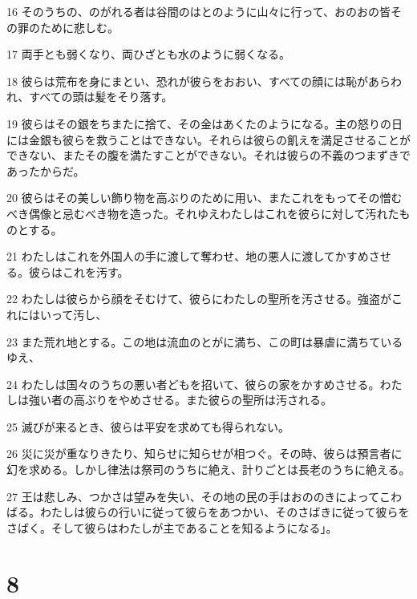 \par 16 そのうちの、のがれる者は谷間のはとのように山々に行って、おのおの皆その罪のために悲しむ。
\par 17 両手とも弱くなり、両ひざとも水のように弱くなる。
\par 18 彼らは荒布を身にまとい、恐れが彼らをおおい、すべての顔には恥があらわれ、すべての頭は髪をそり落す。
\par 19 彼らはその銀をちまたに捨て、その金はあくたのようになる。主の怒りの日には金銀も彼らを救うことはできない。それらは彼らの飢えを満足させることができない、またその腹を満たすことができない。それは彼らの不義のつまずきであったからだ。
\par 20 彼らはその美しい飾り物を高ぶりのために用い、またこれをもってその憎むべき偶像と忌むべき物を造った。それゆえわたしはこれを彼らに対して汚れたものとする。
\par 21 わたしはこれを外国人の手に渡して奪わせ、地の悪人に渡してかすめさせる。彼らはこれを汚す。
\par 22 わたしは彼らから顔をそむけて、彼らにわたしの聖所を汚させる。強盗がこれにはいって汚し、
\par 23 また荒れ地とする。この地は流血のとがに満ち、この町は暴虐に満ちているゆえ、
\par 24 わたしは国々のうちの悪い者どもを招いて、彼らの家をかすめさせる。わたしは強い者の高ぶりをやめさせる。また彼らの聖所は汚される。
\par 25 滅びが来るとき、彼らは平安を求めても得られない。
\par 26 災に災が重なりきたり、知らせに知らせが相つぐ。その時、彼らは預言者に幻を求める。しかし律法は祭司のうちに絶え、計りごとは長老のうちに絶える。
\par 27 王は悲しみ、つかさは望みを失い、その地の民の手はおののきによってこわばる。わたしは彼らの行いに従って彼らをあつかい、そのさばきに従って彼らをさばく。そして彼らはわたしが主であることを知るようになる」。

\chapter{8}

